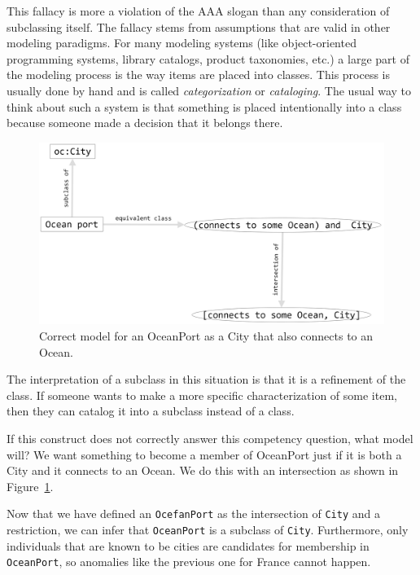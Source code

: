 This fallacy is more a violation of the AAA slogan than any
consideration of subclassing itself. The
fallacy stems from assumptions that are valid in other modeling
paradigms. For many modeling systems (like object-oriented programming
systems, library catalogs, product taxonomies, etc.) a large part of the
modeling process is the way items are placed into classes. This process
is usually done by hand and is called \emph{categorization} or \emph{cataloging}. The
usual way to think about such a system is that something is placed
intentionally into a class because someone made a decision that it
belongs there.



\begin{figure}
\centering
\includegraphics[width=5in]{SWWOv3/media/ch15/figure15-3.png}
\caption{Correct model for an OceanPort as a City that also connects to an Ocean.}
\label{fig:ch15.03}
\end{figure}



The interpretation of a subclass in this situation is that it is a
refinement of the class. If someone wants to make a more specific
characterization of some item, then they can catalog it into a subclass
instead of a class.

If this construct does not correctly answer this competency question,
what model will? We want something to become a member of OceanPort just
if it is both a City and it connects to an Ocean. We do this with an
intersection as shown in Figure~\ref{fig:ch15.03}.

Now that we have defined an \texttt{OcefanPort} as the intersection of \texttt{City} and a
restriction, we can infer that \texttt{OceanPort} is a subclass of \texttt{City}.
Furthermore, only individuals that are known to be cities are candidates
for membership in \texttt{OceanPort}, so anomalies like the previous one for
France cannot happen.

